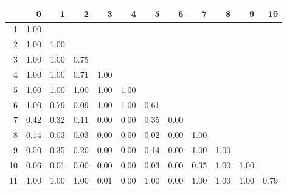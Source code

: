 \begin{tabular}{rrrrrrrrrrrr}
  \hline
 & 0 & 1 & 2 & 3 & 4 & 5 & 6 & 7 & 8 & 9 & 10 \\ 
  \hline
1 & 1.00 &  &  &  &  &  &  &  &  &  &  \\ 
  2 & 1.00 & 1.00 &  &  &  &  &  &  &  &  &  \\ 
  3 & 1.00 & 1.00 & 0.75 &  &  &  &  &  &  &  &  \\ 
  4 & 1.00 & 1.00 & 0.71 & 1.00 &  &  &  &  &  &  &  \\ 
  5 & 1.00 & 1.00 & 1.00 & 1.00 & 1.00 &  &  &  &  &  &  \\ 
  6 & 1.00 & 0.79 & 0.09 & 1.00 & 1.00 & 0.61 &  &  &  &  &  \\ 
  7 & 0.42 & 0.32 & 0.11 & 0.00 & 0.00 & 0.35 & 0.00 &  &  &  &  \\ 
  8 & 0.14 & 0.03 & 0.03 & 0.00 & 0.00 & 0.02 & 0.00 & 1.00 &  &  &  \\ 
  9 & 0.50 & 0.35 & 0.20 & 0.00 & 0.00 & 0.14 & 0.00 & 1.00 & 1.00 &  &  \\ 
  10 & 0.06 & 0.01 & 0.00 & 0.00 & 0.00 & 0.03 & 0.00 & 0.35 & 1.00 & 1.00 &  \\ 
  11 & 1.00 & 1.00 & 1.00 & 0.01 & 0.00 & 1.00 & 0.00 & 1.00 & 1.00 & 1.00 & 0.79 \\ 
   \hline
\end{tabular}

